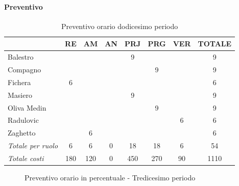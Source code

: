 \documentclass[a4paper,12pt]{article}
\begin{document}
            \paragraph{Preventivo}
                \begin{table}[H]
                \centering
                \caption{Preventivo orario dodicesimo periodo}
                \begin{tabular}{|l|c|c|c|c|c|c|c|}
                \hline
                    \rowcolor{lightgray}{\textbf{Membro}} & {\textbf{RE}} & {\textbf{AM}} & {\textbf{AN}} & {\textbf{PRJ}} & {\textbf{PRG}} & {\textbf{VER}} & {\textbf{TOTALE}}\\
                \hline
                    Balestro & & & & 9 & & & 9\\
                \hline
                    Compagno & & & & & 9 & & 9\\
                \hline
                    Fichera & 6 & & & & & & 6\\
                \hline
                    Masiero & & & & 9 & & & 9\\
                \hline
                    Oliva Medin & & & & & 9 & & 9\\
                \hline
                    Radulovic & & & & & & 6 & 6\\
                \hline
                    Zaghetto & & 6 & & & & & 6\\
                \hline
                    \rowcolor{lightgray}\textit{Totale per ruolo} & 6 & 6 & 0 & 18 & 18 & 6 & 54\\
                \hline
                    \rowcolor{lightgray}\textit{Totale costi} & 180 & 120 & 0 & 450 & 270 & 90 & 1110\\
                \hline
                \end{tabular}
                \end{table}

                \begin{figure}[H]
                \centering
                \caption{Preventivo orario in percentuale - Tredicesimo periodo}
                \end{figure}
                
\end{document}
